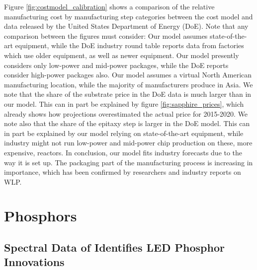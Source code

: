 \documentclass[10pt]{article}
\begin{document}
Figure \ref{fig:costmodel_calibration} shows a comparison of the relative manufacturing cost by manufacturing step categories between the cost model and data released by the United States Department of Energy (DoE). Note that any comparison between the figures must consider: Our model assumes state-of-the-art equipment, while the DoE industry round table reports data from factories which use older equipment, as well as newer equipment. Our model presently considers only low-power and mid-power packages, while the DoE reports consider high-power packages also. Our model assumes a virtual North American manufacturing location, while the majority of manufacturers produce in Asia. We note that the share of the substrate price in the DoE data is much larger than in our model. This can in part be explained by figure \ref{fig:sapphire_prices}, which already shows how projections overestimated the actual price for 2015-2020. We note also that the share of the epitaxy step is larger in the DoE model. This can in part be explained by our model relying on state-of-the-art equipment, while industry might not run low-power and mid-power chip production on these, more expensive, reactors. In conclusion, our model fits industry forecasts due to the way it is set up. The packaging part of the manufacturing process is increasing in importance, which has been confirmed by researchers and industry reports on WLP\cite{Lee2011WPL}\cite{Xie2013}\cite{ledsmag2017WLP}.

\newpage
\section{Phosphors}

\subsection{Spectral Data of Identifies LED Phosphor Innovations}
\end{document}
